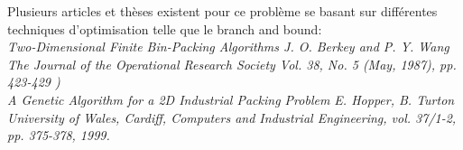Plusieurs articles et thèses existent pour ce problème se basant sur différentes techniques d'optimisation telle que le branch and bound:\\

\textit{  Two-Dimensional Finite Bin-Packing Algorithms J. O. Berkey and P. Y. Wang The Journal of the Operational Research Society Vol. 38, No. 5 (May, 1987), pp. 423-429  ) }\\

\textit{A Genetic Algorithm for a 2D Industrial Packing Problem E. Hopper, B. Turton University of Wales, Cardiff, Computers and Industrial Engineering, vol. 37/1-2, pp. 375-378, 1999. }\\
